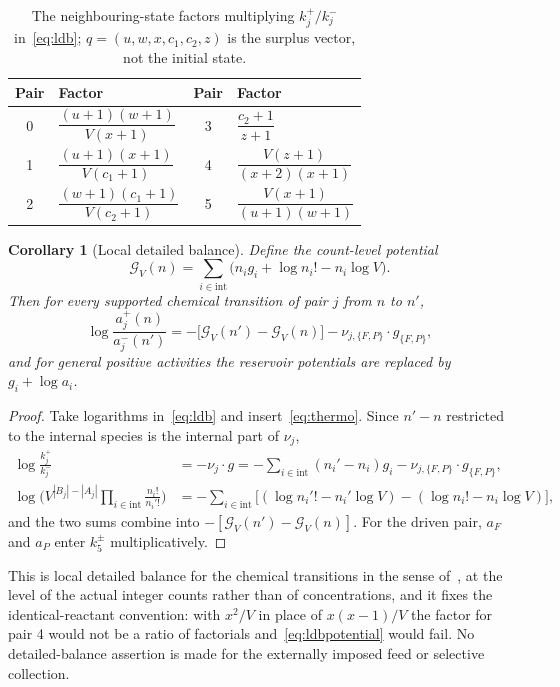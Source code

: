 \documentclass[11pt,a4paper]{article}
\theoremstyle{plain}
\newtheorem{corollary}[theorem]{Corollary}
\theoremstyle{definition}
\theoremstyle{remark}
\newcommand{\GV}{\mathcal G_V}
\begin{document}
\begin{table}[t]\centering
\caption{The neighbouring-state factors multiplying $k_j^+/k_j^-$ in~\eqref{eq:ldb}; $q=(u,w,x,c_1,c_2,z)$ is the surplus vector, not the initial state.}\label{tab:ratios}
\begin{tabular}{clcl}\toprule
Pair & Factor & Pair & Factor\\\midrule
0 & $\dfrac{(u+1)(w+1)}{V(x+1)}$ & 3 & $\dfrac{c_2+1}{z+1}$\\[9pt]
1 & $\dfrac{(u+1)(x+1)}{V(c_1+1)}$ & 4 & $\dfrac{V(z+1)}{(x+2)(x+1)}$\\[9pt]
2 & $\dfrac{(w+1)(c_1+1)}{V(c_2+1)}$ & 5 & $\dfrac{V(x+1)}{(u+1)(w+1)}$\\[6pt]\bottomrule
\end{tabular}
\end{table}

\begin{corollary}[Local detailed balance]\label{cor:ldb}
Define the count-level potential
\begin{equation}\label{eq:GV}
 \GV(n)=\sum_{i\in\mathrm{int}}\big(n_ig_i+\log n_i!-n_i\log V\big).
\end{equation}
Then for every supported chemical transition of pair $j$ from $n$ to $n'$,
\begin{equation}\label{eq:ldbpotential}
 \log\frac{a_j^+(n)}{a_j^-(n')}=-\big[\GV(n')-\GV(n)\big]-\nu_{j,\{F,P\}}\cdot g_{\{F,P\}},
\end{equation}
and for general positive activities the reservoir potentials are replaced by $g_i+\log a_i$.
\end{corollary}
\begin{proof}
Take logarithms in~\eqref{eq:ldb} and insert~\eqref{eq:thermo}. Since $n'-n$ restricted to the internal species is the internal part of $\nu_j$,
\begin{align*}
 \log\frac{k_j^+}{k_j^-}&=-\nu_j\cdot g=-\sum_{i\in\mathrm{int}}(n_i'-n_i)g_i-\nu_{j,\{F,P\}}\cdot g_{\{F,P\}},\\
 \log\Big(V^{|B_j|-|A_j|}\prod_{i\in\mathrm{int}}\frac{n_i!}{n_i'!}\Big)&=-\sum_{i\in\mathrm{int}}\big[(\log n_i'!-n_i'\log V)-(\log n_i!-n_i\log V)\big],
\end{align*}
and the two sums combine into $-[\GV(n')-\GV(n)]$. For the driven pair, $a_F$ and $a_P$ enter $k_5^\pm$ multiplicatively.
\end{proof}
This is local detailed balance for the chemical transitions in the sense of~\citep{schmiedl2007,rao2018}, at the level of the actual integer counts rather than of concentrations, and it fixes the identical-reactant convention: with $x^2/V$ in place of $x(x-1)/V$ the factor for pair 4 would not be a ratio of factorials and~\eqref{eq:ldbpotential} would fail. No detailed-balance assertion is made for the externally imposed feed or selective collection.
\end{document}
